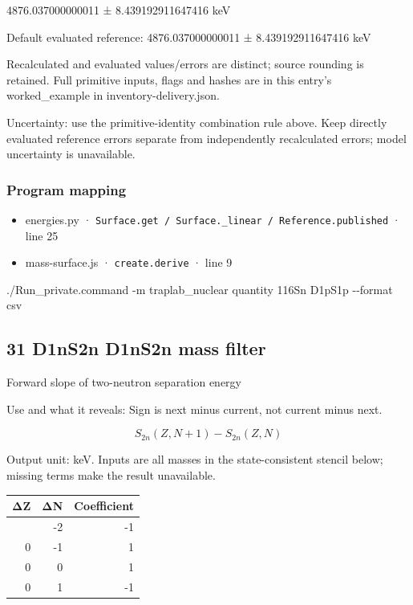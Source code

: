 \documentclass[
  11pt,
  letterpaper,
]{article}
\newenvironment{Shaded}{}{}
\newcommand{\AttributeTok}[1]{\textcolor[rgb]{0.49,0.56,0.16}{#1}}
\newcommand{\ExtensionTok}[1]{#1}
\newcommand{\NormalTok}[1]{#1}
\providecommand{\tightlist}{%
  \setlength{\itemsep}{0pt}\setlength{\parskip}{0pt}}
\begin{document}
4876.037000000011 ± 8.439192911647416 keV

Default evaluated reference: 4876.037000000011 ± 8.439192911647416 keV

Recalculated and evaluated values/errors are distinct; source rounding
is retained. Full primitive inputs, flags and hashes are in this entry's
worked\_example in inventory-delivery.json.

Uncertainty: use the primitive-identity combination rule above. Keep
directly evaluated reference errors separate from independently
recalculated errors; model uncertainty is unavailable.

\subsubsection{Program mapping}\label{program-mapping-29}

\begin{itemize}
\tightlist
\item
  energies.py ·
  \texttt{Surface.get\ /\ Surface.\_linear\ /\ Reference.published} ·
  line 25
\item
  mass-surface.js · \texttt{create.derive} · line 9
\end{itemize}

\begin{Shaded}
\begin{Highlighting}[]
\ExtensionTok{./Run\_private.command} \AttributeTok{{-}m}\NormalTok{ traplab\_nuclear quantity 116Sn D1pS1p }\AttributeTok{{-}{-}format}\NormalTok{ csv}
\end{Highlighting}
\end{Shaded}

\subsection{31 D1nS2n D1nS2n mass
filter}\label{d1ns2n-d1ns2n-mass-filter}

Forward slope of two-neutron separation energy

Use and what it reveals: Sign is next minus current, not current minus
next.

\[
S_{2n}(Z,N+1)-S_{2n}(Z,N)
\]

Output unit: keV. Inputs are all masses in the state-consistent stencil
below; missing terms make the result unavailable.

\begin{longtable}[]{@{}rrr@{}}
\toprule\noalign{}
ΔZ & ΔN & Coefficient \\
\midrule\noalign{}
\endhead
\bottomrule\noalign{}
\endlastfoot
0 & -2 & -1 \\
0 & -1 & 1 \\
0 & 0 & 1 \\
0 & 1 & -1 \\
\end{longtable}
\end{document}
